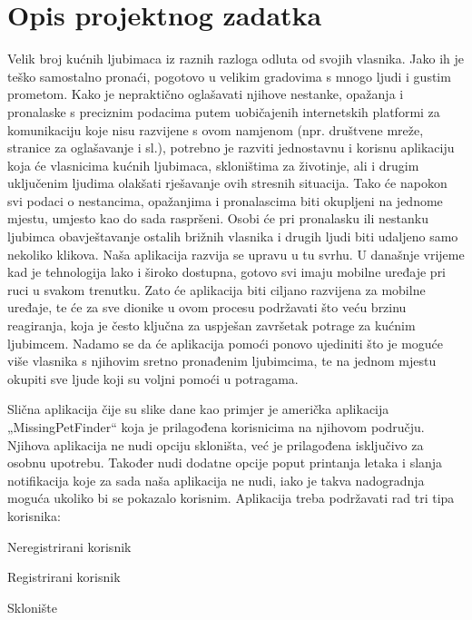 \chapter{Opis projektnog zadatka}
		
		Velik broj kućnih ljubimaca iz raznih razloga odluta od svojih vlasnika. Jako ih je teško samostalno pronaći, pogotovo u velikim gradovima s mnogo ljudi i gustim prometom. Kako je nepraktično oglašavati njihove nestanke, opažanja i pronalaske s preciznim podacima putem uobičajenih internetskih platformi za komunikaciju koje nisu razvijene s ovom namjenom (npr. društvene mreže, stranice za oglašavanje i sl.), potrebno je razviti jednostavnu i korisnu aplikaciju koja će vlasnicima kućnih ljubimaca, skloništima za životinje, ali i drugim uključenim ljudima olakšati rješavanje ovih stresnih situacija. Tako će napokon svi podaci o nestancima, opažanjima i pronalascima biti okupljeni na jednome mjestu, umjesto kao do sada raspršeni. Osobi će pri pronalasku ili nestanku ljubimca obavještavanje ostalih brižnih vlasnika i drugih ljudi biti udaljeno samo nekoliko klikova. Naša aplikacija razvija se upravu u tu svrhu. U današnje vrijeme kad je tehnologija lako i široko dostupna, gotovo svi imaju mobilne uređaje pri ruci u svakom trenutku. Zato će aplikacija biti ciljano razvijena za mobilne uređaje, te će za sve dionike u ovom procesu podržavati što veću brzinu reagiranja, koja je često ključna za uspješan završetak potrage za kućnim ljubimcem. Nadamo se da će aplikacija pomoći ponovo ujediniti što je moguće više vlasnika s njihovim sretno pronađenim ljubimcima, te na jednom mjestu okupiti sve ljude koji su voljni pomoći u potragama. 

Slična aplikacija čije su slike dane kao primjer je američka aplikacija „MissingPetFinder“ koja je prilagođena korisnicima na njihovom području.  Njihova aplikacija ne nudi opciju skloništa, već je prilagođena isključivo za osobnu upotrebu. Također nudi dodatne opcije poput printanja letaka i slanja notifikacija koje za sada naša aplikacija ne nudi, iako je takva nadogradnja moguća ukoliko bi se pokazalo korisnim.
Aplikacija treba podržavati rad tri tipa korisnika:

		\begin{packed_item}
			
			\item  Neregistrirani korisnik
			\item  Registrirani korisnik
			\item  Sklonište
			
		\end{packed_item}

